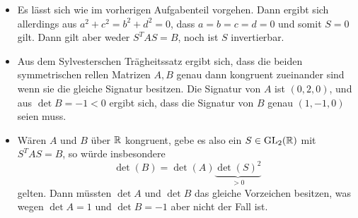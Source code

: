 \begin{itemize}
  \item
    Es lässt sich wie im vorherigen Aufgabenteil vorgehen.
    Dann ergibt sich allerdings aus $a^2 + c^2 = b^2 + d^2 = 0$, dass $a = b = c = d = 0$ und somit $S = 0$ gilt.
    Dann gilt aber weder $S^T A S = B$, noch ist $S$ invertierbar.
  \item
    Aus dem Sylvesterschen Trägheitssatz ergibt sich, dass die beiden symmetrischen rellen Matrizen $A, B$ genau dann kongruent zueinander sind wenn sie die gleiche Signatur besitzen.
    Die Signatur von $A$ ist $(0,2,0)$, und aus $\det B = -1 < 0$ ergibt sich, dass die Signatur von $B$ genau $(1,-1,0)$ seien muss.
  \item
    Wären $A$ und $B$ über $\mathbb{R}$ kongruent, gebe es also ein $S \in \operatorname{GL}_{2}(\mathbb{R})$ mit $S^T A S = B$, so würde insbesondere
    \[
        \det(B)
      = \det(A) \underbrace{\det(S)^2}_{> 0}
    \]
    gelten.
    Dann müssten $\det A$ und $\det B$ das gleiche Vorzeichen besitzen, was wegen $\det A = 1$ und $\det B = -1$ aber nicht der Fall ist.
\end{itemize}




